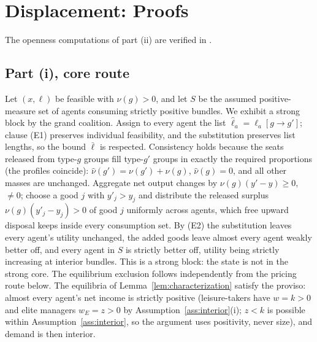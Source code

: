 \documentclass[12pt,letterpaper]{article}
\theoremstyle{definition}
\begin{document}
\section{Displacement: Proofs}\label{app:displacement}

The openness computations of part (ii) are verified in
.

\subsection{Part (i), core route}
Let $(x,\ell)$ be feasible with $\nu(g)>0$, and let $S$ be the assumed positive-measure set of agents consuming strictly positive bundles.
We exhibit a strong block by the grand coalition.
Assign to every agent the list $\hat\ell_a=\ell_a[g\rightarrow g']$; clause (E1) preserves individual feasibility, and the substitution preserves list lengths, so the bound $\bar\ell$ is respected.
Consistency holds because the seats released from type-$g$ groups fill type-$g'$ groups in exactly the required proportions (the profiles coincide): $\hat\nu(g')=\nu(g')+\nu(g)$, $\hat\nu(g)=0$, and all other masses are unchanged.
Aggregate net output changes by $\nu(g)(y'-y)\geq 0$, $\neq 0$; choose a good $j$ with $y'_j>y_j$ and distribute the released surplus $\nu(g)(y'_j-y_j)>0$ of good $j$ uniformly across agents, which free upward disposal keeps inside every consumption set.
By (E2) the substitution leaves every agent's utility unchanged, the added goods leave almost every agent weakly better off, and every agent in $S$ is strictly better off, utility being strictly increasing at interior bundles.
This is a strong block: the state is not in the strong core.
The equilibrium exclusion follows independently from the pricing route below.
The equilibria of Lemma~\ref{lem:characterization} satisfy the proviso: almost every agent's net income is strictly positive (leisure-takers have $w=k>0$ and elite managers $w_E=z>0$ by Assumption~\ref{ass:interior}(i); $z<k$ is possible within Assumption~\ref{ass:interior}, so the argument uses positivity, never size), and demand is then interior.
\end{document}
